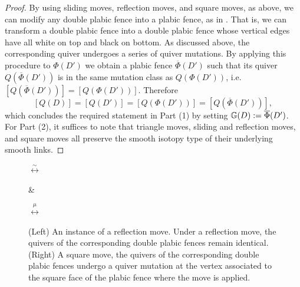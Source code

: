 \begin{proof}
\noindent By using sliding moves, reflection moves, and square moves, as above, we can modify any double plabic fence into a plabic fence, as in . That is, we can transform a double plabic fence into a double plabic fence whose vertical edges have all white on top and black on bottom. As discussed above, the corresponding quiver undergoes a series of quiver mutations. By applying this procedure to $\Phi(D')$ we obtain a plabic fence $\overline{\Phi}(D')$ such that its quiver $Q(\overline{\Phi}(D'))$ is in the same mutation class as $Q(\Phi(D'))$, i.e.~$[Q(\overline{\Phi}(D'))]=[Q(\Phi(D'))]$. Therefore
$$[Q(D)]=[Q(D')]=[Q(\Phi(D'))]=[Q(\overline{\Phi}(D'))],$$
which concludes the required statement in Part (1) by setting $\mathbb G(D):=\overline{\Phi}(D')$. For Part (2), it suffices to note that triangle moves, sliding and reflection moves, and square moves all preserve the smooth isotopy type of their underlying smooth links.
\end{proof}

\begin{figure}
     \quad $\stackrel{\sim}{\longleftrightarrow}$ \quad
     \quad\quad \& \quad \quad     {} \quad $\stackrel{\mu}{\longleftrightarrow}$ \quad
     \caption{(Left) An instance of a reflection move. Under a reflection move, the quivers of the corresponding double plabic fences remain identical. (Right) A square move, the quivers of the corresponding double plabic fences undergo a quiver mutation at the vertex associated to the square face of the plabic fence where the move is applied.}
    \label{fig:reduction_and_sq_move}
\end{figure}

